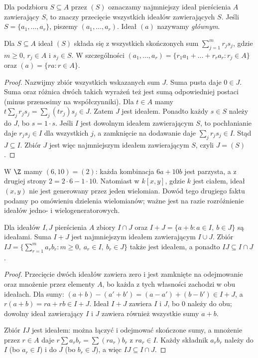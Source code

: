 \begin{definicja}
Dla podzbioru $S\subseteq A$ przez $(S)$ oznaczamy najmniejszy ideał
pierścienia $A$ zawierający $S$, to znaczy przecięcie wszystkich ideałów
zawierających $S$. Jeśli $S=\{a_1,\dots,a_r\}$, piszemy
$(a_1,\dots,a_r)$. Ideał $(a)$ nazywamy \emph{głównym}.
\end{definicja}

\begin{stwierdzenie}
Dla $S\subseteq A$ ideał $(S)$ składa się z wszystkich skończonych sum
$\sum_{j=1}^m r_js_j$, gdzie $m\ge0$, $r_j\in A$ i $s_j\in S$.
W szczególności $(a_1,\dots,a_r)=\{r_1a_1+\dots+r_ra_r:r_j\in A\}$
oraz $(a)=\{ra:r\in A\}$.
\end{stwierdzenie}
\begin{proof}
Nazwijmy zbiór wszystkich wskazanych sum $J$.
Suma pusta daje $0\in J$. Suma oraz różnica dwóch takich wyrażeń
też jest sumą odpowiedniej postaci (minus przenosimy na współczynniki).
Dla $t\in A$ mamy $t\sum_jr_js_j=\sum_j(tr_j)s_j\in J$.
Zatem $J$ jest ideałem. Ponadto każdy $s\in S$ należy do $J$,
bo $s=1\cdot s$.
Jeśli $I$ jest dowolnym ideałem zawierającym $S$, to pochłanianie
daje $r_js_j\in I$ dla wszystkich $j$, a zamknięcie na dodawanie
daje $\sum_jr_js_j\in I$. Stąd $J\subseteq I$.
Zbiór $J$ jest więc najmniejszym ideałem zawierającym $S$, czyli $J=(S)$.
\end{proof}

\begin{przyklad}
W $\Z$ mamy $(6,10)=(2)$: każda kombinacja $6a+10b$ jest parzysta,
a z drugiej strony $2=2\cdot6-1\cdot10$.
Natomiast w $k[x,y]$, gdzie $k$ jest ciałem, ideał $(x,y)$
nie jest generowany przez jeden wielomian.
Dowód tego drugiego faktu podamy po omówieniu dzielenia wielomianów;
ważne jest na razie rozróżnienie ideałów jedno- i wielogeneratorowych.
\end{przyklad}

\begin{stwierdzenie}
Dla ideałów $I,J$ pierścienia $A$ zbiory
$I\cap J$ oraz $I+J=\{a+b:a\in I,\ b\in J\}$ są ideałami.
Suma $I+J$ jest najmniejszym ideałem zawierającym $I\cup J$.
Zbiór
$IJ=\{\sum_{r=1}^m a_rb_r:m\ge0,\ a_r\in I,\ b_r\in J\}$
także jest ideałem, a ponadto $IJ\subseteq I\cap J$.
\end{stwierdzenie}
\begin{proof}
Przecięcie dwóch ideałów zawiera zero i jest zamknięte na odejmowanie
oraz mnożenie przez elementy $A$, bo każda z tych własności zachodzi
w obu ideałach. Dla sumy: $(a+b)-(a'+b')=(a-a')+(b-b')\in I+J$,
a $r(a+b)=ra+rb\in I+J$. Ideał $I+J$ zawiera $I$ i $J$,
bo $0$ należy do obu; dowolny ideał zawierający $I$ i $J$ zawiera
również wszystkie sumy $a+b$.

Zbiór $IJ$ jest ideałem: można łączyć i odejmować skończone sumy,
a mnożenie przez $r\in A$ daje
$r\sum a_rb_r=\sum(ra_r)b_r$ z $ra_r\in I$.
Każdy składnik $a_rb_r$ należy do $I$ (bo $a_r\in I$)
i do $J$ (bo $b_r\in J$), a więc $IJ\subseteq I\cap J$.
\end{proof}

